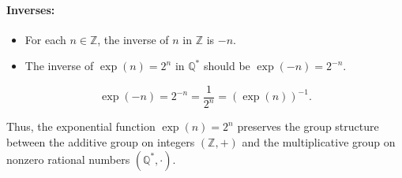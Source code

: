 \paragraph{Inverses:}
\begin{itemize}
	\item For each \( n \in \mathbb{Z} \), the inverse of \( n \) in \(\mathbb{Z}\) is \(-n\).
	\item The inverse of \( \exp(n) = 2^n \) in \(\mathbb{Q}^*\) should be \( \exp(-n) = 2^{-n} \).
\end{itemize}
\[
\exp(-n) = 2^{-n} = \frac{1}{2^n} = (\exp(n))^{-1}.
\]

Thus, the exponential function \( \exp(n) = 2^n \) preserves the group structure between the additive group on integers \((\mathbb{Z}, +)\) and the multiplicative group on nonzero rational numbers \((\mathbb{Q}^*, \cdot)\).